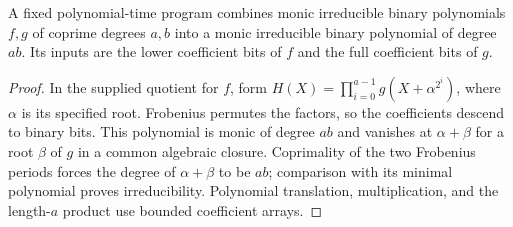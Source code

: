 \begin{lemma}
\label{lem:binary-coprime-degree-combination}
\leanok
A fixed polynomial-time program combines monic irreducible binary polynomials
$f,g$ of coprime degrees $a,b$ into a monic irreducible binary polynomial of
degree $ab$. Its inputs are the lower coefficient bits of $f$ and the full
coefficient bits of $g$.
\end{lemma}
\begin{proof}
\leanok
In the supplied quotient for $f$, form
$H(X)=\prod_{i=0}^{a-1}g(X+\alpha^{2^i})$, where $\alpha$ is its specified root.
Frobenius permutes the factors, so the coefficients descend to binary bits.
This polynomial is monic of degree $ab$ and vanishes at $\alpha+\beta$ for a
root $\beta$ of $g$ in a common algebraic closure. Coprimality of the two
Frobenius periods forces the degree of $\alpha+\beta$ to be $ab$; comparison
with its minimal polynomial proves irreducibility. Polynomial translation,
multiplication, and the length-$a$ product use bounded coefficient arrays.
\end{proof}


